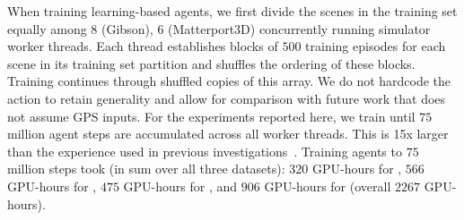 \vspace{1em}
When training learning-based agents, we first divide 
the scenes in the training set equally among 
$8$ (Gibson), $6$ (Matterport3D) concurrently running simulator worker threads. 
Each thread establishes blocks of $500$ training 
episodes for each scene in its training set partition 
and shuffles the ordering of these blocks. 
Training continues through shuffled copies of this array. 
We do not hardcode the \callstop action to retain generality and allow for comparison with future work that does not assume GPS inputs.
For the experiments reported here, we train until 
$75$ million agent steps are accumulated across 
all worker threads. This is 15x larger than the 
experience used in previous investigations~\cite{mishkin2019benchmarking, kojima2019learn}. 
Training agents to $75$ million steps took (in sum over all three datasets): $320$ GPU-hours for \blind, $566$ GPU-hours for \rgb, $475$ GPU-hours for \depth, and $906$ GPU-hours for \rgbd (overall $2267$ GPU-hours).

